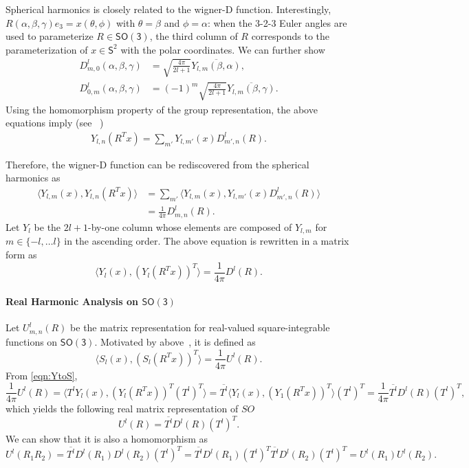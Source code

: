 \documentclass[onecolumn,11pt]{IEEEtran}
\newcommand{\pair}[1]{\ensuremath{\langle #1 \rangle}}
\newcommand{\SO}{\ensuremath{\mathsf{SO(3)}}}
\newcommand{\Sph}{\ensuremath{\mathsf{S}}}
\begin{document}
Spherical harmonics is closely related to the wigner-D function. 
Interestingly, $R(\alpha,\beta,\gamma)e_3=x(\theta,\phi)$ with $\theta=\beta$ and $\phi=\alpha$: when the 3-2-3 Euler angles are used to parameterize $R\in\SO$, the third column of $R$ corresponds to the parameterization of $x\in\Sph^2$ with the polar coordinates.  
We can further show
\begin{align*}
    D^l_{m,0}(\alpha,\beta,\gamma) &= \sqrt{\frac{4\pi}{2l+1}}\overline{Y_{l,m}(\beta,\alpha)},\\
    D^l_{0,m}(\alpha,\beta,\gamma) &= (-1)^m\sqrt{\frac{4\pi}{2l+1}}\overline{Y_{l,m}(\beta,\gamma)}.
\end{align*}
Using the homomorphism property of the group representation, the above equations imply (see ~\cite[pp. 342]{ChiKya01})
\begin{align*}
    Y_{l,n}(R^T x) = \sum_{m'} Y_{l,m'}(x) D^l_{m',n}(R) .
\end{align*}

Therefore, the wigner-D function can be rediscovered from the spherical harmonics as
\begin{align*}
    \pair{Y_{l,m}(x), Y_{l,n}(R^T x) } &= \sum_{m'} \pair{Y_{l,m}(x), Y_{l,m'}(x) D^l_{m',n}(R) }\\
    & = \frac{1}{4\pi} D^l_{m,n}(R).
\end{align*}
Let $Y_l$ be the $2l+1$-by-one column whose elements are composed of $Y_{l,m}$ for $m\in\{-l,\ldots l\}$ in the ascending order. 
The above equation is rewritten in a matrix form as
\[
    \pair{ Y_l(x), (Y_l(R^Tx))^T } = \frac{1}{4\pi} D^l(R).
\]

\paragraph{Real Harmonic Analysis on $\SO$}
Let $U^l_{m,n}(R)$ be the matrix representation for  real-valued square-integrable functions on $\SO$. 
Motivated by above~\cite{BlaFloJMS97}, it is defined as
\[
    \pair{ S_l(x), (S_l(R^Tx))^T } = \frac{1}{4\pi} U^l(R).
\]
From \eqref{eqn:YtoS},
\[
\frac{1}{4\pi} U^l(R) = \pair{ T^l Y_l(x),  (Y_l(R^T x))^T (T^l)^T } 
= \overline{T^l} \pair{ Y_l(x), (Y_1(R^T x))^T} (T^l)^T
= \frac{1}{4\pi} \overline{T^l} D^l(R) (T^l)^T,
\]
which yields the following real matrix representation of $SO$
\begin{equation}
    U^l (R) = \overline{T^l} D^l(R) (T^l)^T.\label{eqn:Ul}
\end{equation}
We can show that it is also a homomorphism as
\[
    U^l( R_1 R_2) = \overline{T^l} D^l(R_1)D^l(R_2)  (T^l)^T
    =\overline{T^l} D^l(R_1) (T^l)^T  \overline{T^l} D^l(R_2)  (T^l)^T
    = U^l(R_1) U^l(R_2).
\]
\end{document}
